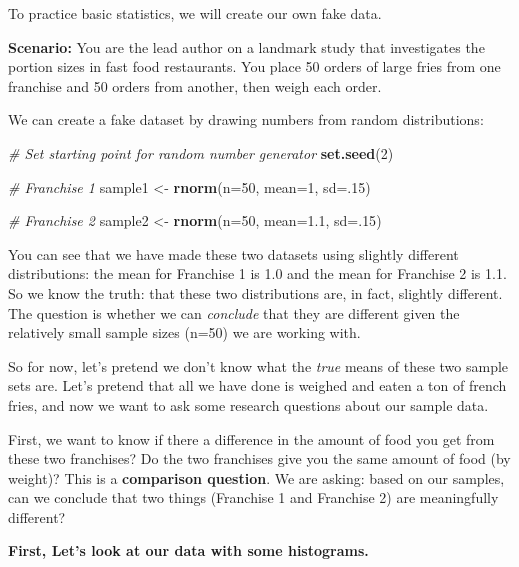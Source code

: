 \documentclass[
]{book}
\newenvironment{Shaded}{\begin{snugshade}}{\end{snugshade}}
\newcommand{\CommentTok}[1]{\textcolor[rgb]{0.56,0.35,0.01}{\textit{#1}}}
\newcommand{\DataTypeTok}[1]{\textcolor[rgb]{0.13,0.29,0.53}{#1}}
\newcommand{\DecValTok}[1]{\textcolor[rgb]{0.00,0.00,0.81}{#1}}
\newcommand{\FloatTok}[1]{\textcolor[rgb]{0.00,0.00,0.81}{#1}}
\newcommand{\KeywordTok}[1]{\textcolor[rgb]{0.13,0.29,0.53}{\textbf{#1}}}
\newcommand{\NormalTok}[1]{#1}
\newcommand{\StringTok}[1]{\textcolor[rgb]{0.31,0.60,0.02}{#1}}
\begin{document}
To practice basic statistics, we will create our own fake data.

\textbf{Scenario:} You are the lead author on a landmark study that investigates the portion sizes in fast food restaurants. You place 50 orders of large fries from one franchise and 50 orders from another, then weigh each order.

We can create a fake dataset by drawing numbers from random distributions:

\begin{Shaded}
\begin{Highlighting}[]
\CommentTok{# Set starting point for random number generator}
\KeywordTok{set.seed}\NormalTok{(}\DecValTok{2}\NormalTok{)}

\CommentTok{# Franchise 1}
\NormalTok{sample1 <-}\StringTok{ }\KeywordTok{rnorm}\NormalTok{(}\DataTypeTok{n=}\DecValTok{50}\NormalTok{, }\DataTypeTok{mean=}\DecValTok{1}\NormalTok{, }\DataTypeTok{sd=}\NormalTok{.}\DecValTok{15}\NormalTok{)}

\CommentTok{# Franchise 2}
\NormalTok{sample2 <-}\StringTok{ }\KeywordTok{rnorm}\NormalTok{(}\DataTypeTok{n=}\DecValTok{50}\NormalTok{, }\DataTypeTok{mean=}\FloatTok{1.1}\NormalTok{, }\DataTypeTok{sd=}\NormalTok{.}\DecValTok{15}\NormalTok{)}
\end{Highlighting}
\end{Shaded}

You can see that we have made these two datasets using slightly different distributions: the mean for Franchise 1 is 1.0 and the mean for Franchise 2 is 1.1. So we know the truth: that these two distributions are, in fact, slightly different. The question is whether we can \emph{conclude} that they are different given the relatively small sample sizes (n=50) we are working with.

So for now, let's pretend we don't know what the \emph{true} means of these two sample sets are. Let's pretend that all we have done is weighed and eaten a ton of french fries, and now we want to ask some research questions about our sample data.

First, we want to know if there a difference in the amount of food you get from these two franchises? Do the two franchises give you the same amount of food (by weight)? This is a \textbf{comparison question}. We are asking: based on our samples, can we conclude that two things (Franchise 1 and Franchise 2) are meaningfully different?

\textbf{First, Let's look at our data with some histograms.}
\end{document}
